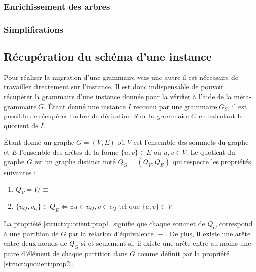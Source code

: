 \subsubsection{Enrichissement des arbres}

\subsubsection{Simplifications}

\subsection{Récupération du schéma d'une instance}

Pour réaliser la migration d'une grammaire vers une autre il est nécessaire de travailler directement sur l'instance.
Il est donc indispensable de pouvoir récupérer la grammaire d'une instance donnée pour la vérifier à l'aide de la méta-grammaire $G$.
Étant donné une instance $I$ reconnu par une grammaire $G_S$, il est possible de récupérer l'arbre de dérivation $S$ de la grammaire $G$ en calculant le quotient de $I$.

\begin{definition}
    Étant donné un graphe $G = (V, E)$ où $V$ est l'ensemble des sommets du graphe et $E$ l'ensemble des arêtes de la forme $\{u, v\} \in E$ où $u, v \in V$.
    Le quotient du graphe $G$ est un graphe distinct noté $Q_G = (Q_V, Q_E)$ qui respecte les propriétés suivantes :
    \begin{enumerate}
        \item \label{struct:quotient:prop1} $Q_V = V / \equiv$
        \item \label{struct:quotient:prop2} $\{u_Q, v_Q\} \in Q_E \iff \exists u \in u_Q, v \in v_Q$ tel que $\{u, v\} \in V$
    \end{enumerate}
    La propriété \ref{struct:quotient:prop1} signifie que chaque sommet de $Q_G$ correspond à une partition de $G$ par la relation d'équivalence $\equiv$.
    De plus, il existe une arête entre deux nœuds de $Q_G$ si et seulement si, il existe une arête entre au moins une paire d'élément de chaque partition dans $G$ comme définit par la propriété \ref{struct:quotient:prop2}.
\end{definition}

\begin{example}

\end{example}

